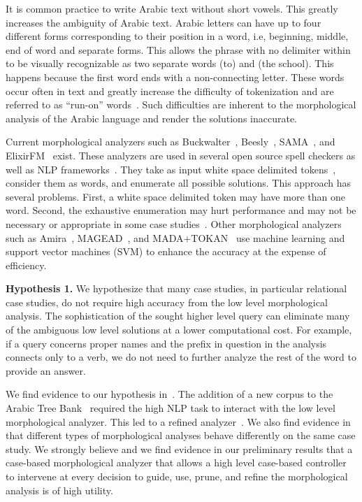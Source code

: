 \documentclass[12pt]{article}
\newcommand{\noTrRL}[1]{\transfalse\RL{#1}\transtrue}
\begin{document}
It is common practice to write Arabic text
without short vowels. 
This greatly increases the ambiguity of Arabic text. 
Arabic letters can have up to 
four different forms
corresponding to their position in a word, i.e, beginning,
middle, end of word and separate forms. 
This allows the phrase
\noTrRL{il_A\nospace almdrsT}  with no delimiter within
to be visually recognizable
as two separate words  (to) and  (the school).
This happens because the first word  ends with
 a non-connecting letter. 
These words occur often in text and greatly increase the
difficulty of tokenization and are referred to as 
``run-on'' words~\cite{Buckwalter:04}.
Such difficulties are inherent to the 
morphological analysis of the Arabic language and
render the solutions inaccurate.

Current morphological analyzers such as 
Buckwalter~\cite{Buckwalter:02},
Beesly~\cite{Beesley:01}, SAMA~\cite{Kulick:10},
and ElixirFM~\cite{Otakar:07} exist.
These analyzers are used in several open source spell checkers as 
well as NLP frameworks~\cite{Col09}.
They take as input white space delimited tokens~\cite{Kulick:10},
consider them as words,
and enumerate all possible solutions. 
This approach has several problems. 
First, a white space delimited token may have 
more than one word.
Second, the exhaustive enumeration may hurt performance and may
not be necessary or appropriate
in some case studies~\cite{Maamouri:10}. 
Other morphological analyzers such as 
Amira~\cite{Diab:07,Benajiba:07},
MAGEAD~\cite{Habash:05}, and MADA+TOKAN~\cite{Habash:09} 
use machine learning and support vector machines (SVM) 
to enhance the accuracy at the expense of efficiency.

{\bf Hypothesis 1.} We hypothesize that many case studies, 
in particular relational
case studies, do not require high accuracy from the 
low level morphological analysis.
The sophistication of the sought higher level query can eliminate 
many of the ambiguous low level solutions at a lower computational 
cost.
For example, if a query concerns proper names and the 
prefix in question in the analysis connects only to a verb, 
we do not need to further analyze the rest of the word 
to provide an answer.

We find evidence to our hypothesis in~\cite{Maamouri:10}. The 
addition of a new corpus to the Arabic Tree Bank~\cite{Maamouri:04}
required the high NLP task to interact with the low 
level morphological analyzer.
This led to a refined analyzer~\cite{Kulick:10}.  
We also find evidence in~\cite{Habash:06} that different types of 
morphological analyses behave differently on the same case study. 
We strongly believe and we find evidence in our preliminary
results that a 
case-based morphological analyzer that allows a high level 
case-based controller to intervene at every decision to 
guide, use, prune, and refine the morphological analysis
is of high utility.
\end{document}
